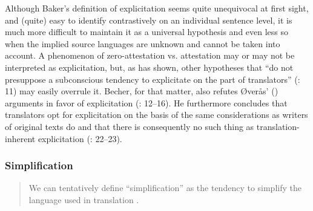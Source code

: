 Although Baker’s definition of explicitation seems quite unequivocal at first sight, and (quite) easy to identify contrastively on an individual sentence level, it is much more difficult to maintain it as a universal hypothesis and even less so when the implied source languages are unknown and cannot be taken into account. A phenomenon of zero-attestation vs. attestation may or may not be interpreted as explicitation, but, as \citet{becher_abandoning_2010} has shown, other hypotheses that “do not presuppose a subconscious tendency to explicitate on the part of translators” (\citeyear{becher_abandoning_2010}: 11) may easily overrule it. Becher, for that matter, also refutes Øverås’ (\citeyear{overas_search_1998}) arguments in favor of explicitation (\citealt{becher_abandoning_2010}: 12–16). He furthermore concludes that translators opt for explicitation on the basis of the same considerations as writers of original texts do and that there is consequently no such thing as translation-inherent explicitation (\citealt{becher_abandoning_2010}: 22–23).


\subsubsection{\label{sec:2.2.2.2}  Simplification}
\begin{quote}
We can tentatively define “simplification” as the tendency to simplify the language used in translation  \citep[181]{Baker1996}.
\end{quote}


